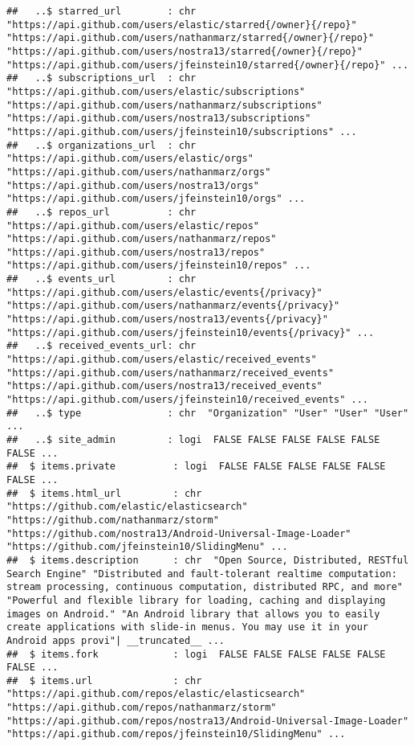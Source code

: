 \documentclass{article}\usepackage[]{graphicx}\usepackage[]{color}
\makeatletter
\newenvironment{kframe}{%
 \def\at@end@of@kframe{}%
 \ifinner\ifhmode%
  \def\at@end@of@kframe{\end{minipage}}%
  \begin{minipage}{\columnwidth}%
 \fi\fi%
 \def\FrameCommand##1{\hskip\@totalleftmargin \hskip-\fboxsep
 \colorbox{shadecolor}{##1}\hskip-\fboxsep
     \hskip-\linewidth \hskip-\@totalleftmargin \hskip\columnwidth}%
 \MakeFramed {\advance\hsize-\width
   \@totalleftmargin\z@ \linewidth\hsize
   \@setminipage}}%
 {\par\unskip\endMakeFramed%
 \at@end@of@kframe}
\newenvironment{knitrout}{}{} %
\makeatother
\begin{document}
\begin{knitrout}
\begin{kframe}
\begin{verbatim}
##   ..$ starred_url        : chr  "https://api.github.com/users/elastic/starred{/owner}{/repo}" "https://api.github.com/users/nathanmarz/starred{/owner}{/repo}" "https://api.github.com/users/nostra13/starred{/owner}{/repo}" "https://api.github.com/users/jfeinstein10/starred{/owner}{/repo}" ...
##   ..$ subscriptions_url  : chr  "https://api.github.com/users/elastic/subscriptions" "https://api.github.com/users/nathanmarz/subscriptions" "https://api.github.com/users/nostra13/subscriptions" "https://api.github.com/users/jfeinstein10/subscriptions" ...
##   ..$ organizations_url  : chr  "https://api.github.com/users/elastic/orgs" "https://api.github.com/users/nathanmarz/orgs" "https://api.github.com/users/nostra13/orgs" "https://api.github.com/users/jfeinstein10/orgs" ...
##   ..$ repos_url          : chr  "https://api.github.com/users/elastic/repos" "https://api.github.com/users/nathanmarz/repos" "https://api.github.com/users/nostra13/repos" "https://api.github.com/users/jfeinstein10/repos" ...
##   ..$ events_url         : chr  "https://api.github.com/users/elastic/events{/privacy}" "https://api.github.com/users/nathanmarz/events{/privacy}" "https://api.github.com/users/nostra13/events{/privacy}" "https://api.github.com/users/jfeinstein10/events{/privacy}" ...
##   ..$ received_events_url: chr  "https://api.github.com/users/elastic/received_events" "https://api.github.com/users/nathanmarz/received_events" "https://api.github.com/users/nostra13/received_events" "https://api.github.com/users/jfeinstein10/received_events" ...
##   ..$ type               : chr  "Organization" "User" "User" "User" ...
##   ..$ site_admin         : logi  FALSE FALSE FALSE FALSE FALSE FALSE ...
##  $ items.private          : logi  FALSE FALSE FALSE FALSE FALSE FALSE ...
##  $ items.html_url         : chr  "https://github.com/elastic/elasticsearch" "https://github.com/nathanmarz/storm" "https://github.com/nostra13/Android-Universal-Image-Loader" "https://github.com/jfeinstein10/SlidingMenu" ...
##  $ items.description      : chr  "Open Source, Distributed, RESTful Search Engine" "Distributed and fault-tolerant realtime computation: stream processing, continuous computation, distributed RPC, and more" "Powerful and flexible library for loading, caching and displaying images on Android." "An Android library that allows you to easily create applications with slide-in menus. You may use it in your Android apps provi"| __truncated__ ...
##  $ items.fork             : logi  FALSE FALSE FALSE FALSE FALSE FALSE ...
##  $ items.url              : chr  "https://api.github.com/repos/elastic/elasticsearch" "https://api.github.com/repos/nathanmarz/storm" "https://api.github.com/repos/nostra13/Android-Universal-Image-Loader" "https://api.github.com/repos/jfeinstein10/SlidingMenu" ...

\end{verbatim}
\end{kframe}
\end{knitrout}
\end{document}
